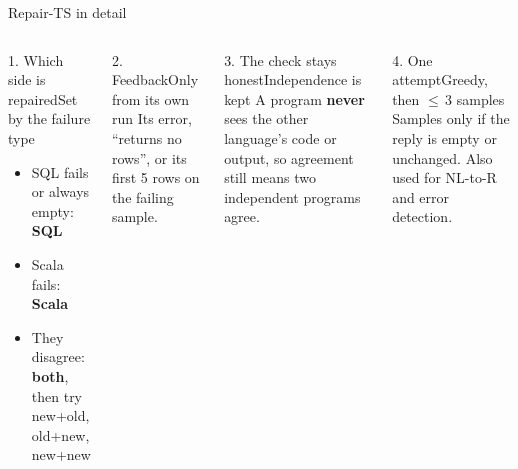 \documentclass[11pt,aspectratio=169]{beamer}
\begin{document}
\begin{frame}{Repair-TS in detail}
\vspace{0.05cm}
\begin{columns}[T]
\begin{tscard}[tsnavy]{1. Which side is repaired}{Set by the failure type}
\begin{itemize}\setlength{\itemsep}{0pt}
\item SQL fails or always empty: \textbf{SQL}
\item Scala fails: \textbf{Scala}
\item They disagree: \textbf{both}, then try new+old, old+new, new+new
\end{itemize}
\end{tscard}
\vspace{0.05cm}
\begin{tscard}[tsnavy]{2. Feedback}{Only from its own run}
Its error, ``returns no rows'', or its first 5 rows on the failing sample.
\end{tscard}
\begin{tscard}[tsred]{3. The check stays honest}{Independence is kept}
A program \textbf{never} sees the other language's code or output, so agreement still means two independent programs agree.
\end{tscard}
\vspace{0.05cm}
\begin{tscard}[tsred]{4. One attempt}{Greedy, then $\leq$\,3 samples}
Samples only if the reply is empty or unchanged. Also used for NL-to-R and error detection.
\end{tscard}
\end{columns}
\end{frame}
\end{document}

